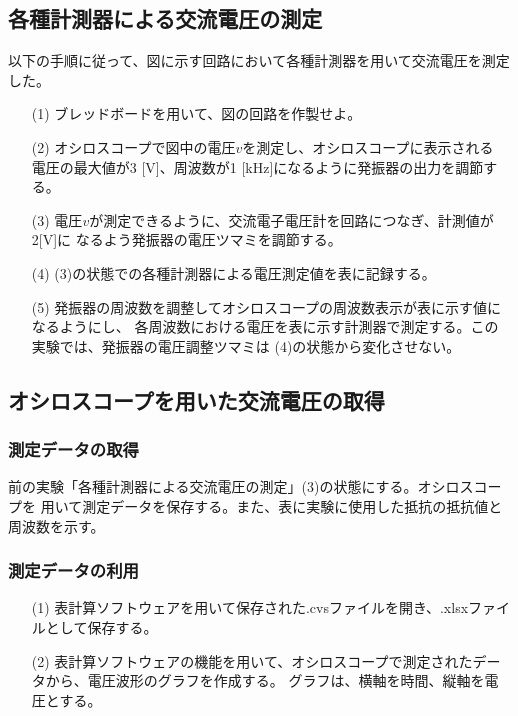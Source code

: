 \documentclass[dvipdfmx]{jsarticle}
\begin{document}
\subsection{各種計測器による交流電圧の測定}
以下の手順に従って、図に示す回路において各種計測器を用いて交流電圧を測定した。
\begin{itemize}
  \item [(1)]ブレッドボードを用いて、図の回路を作製せよ。
  \item [(2)]オシロスコープで図中の電圧$v$を測定し、オシロスコープに表示される
            電圧の最大値が3 [V]、周波数が1 [kHz]になるように発振器の出力を調節する。
  \item [(3)]電圧$v$が測定できるように、交流電子電圧計を回路につなぎ、計測値が2[V]に
              なるよう発振器の電圧ツマミを調節する。
  \item [(4)](3)の状態での各種計測器による電圧測定値を表に記録する。
  \item [(5)]発振器の周波数を調整してオシロスコープの周波数表示が表に示す値になるようにし、
            各周波数における電圧を表に示す計測器で測定する。この実験では、発振器の電圧調整ツマミは
            (4)の状態から変化させない。
\end{itemize}
\subsection{オシロスコープを用いた交流電圧の取得}
\subsubsection{測定データの取得}
前の実験「各種計測器による交流電圧の測定」(3)の状態にする。オシロスコープを
用いて測定データを保存する。また、表に実験に使用した抵抗の抵抗値と周波数を示す。
\subsubsection{測定データの利用}
\begin{itemize}
  \item [(1)]表計算ソフトウェアを用いて保存された.cvsファイルを開き、.xlsxファイルとして保存する。
  \item [(2)]表計算ソフトウェアの機能を用いて、オシロスコープで測定されたデータから、電圧波形のグラフを作成する。
            グラフは、横軸を時間、縦軸を電圧とする。
\end{itemize}
\end{document}
